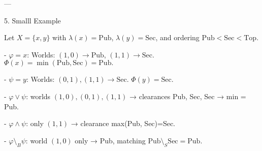 ---

 5. Smalll Example

Let \(X=\{x,y\}\) with \(\lambda(x)=\mathrm{Pub}\), \(\lambda(y)=\mathrm{Sec}\),
and ordering \(\mathrm{Pub}<\mathrm{Sec}<\mathrm{Top}\).

- \(\varphi = x\):  
  Worlds: \((1,0)\to\mathrm{Pub}\), \((1,1)\to\mathrm{Sec}\).  
  \(\Phi(x)=\min(\mathrm{Pub},\mathrm{Sec})=\mathrm{Pub}.\)

- \(\psi = y\):  
  Worlds: \((0,1),(1,1)\to\mathrm{Sec}\).  
  \(\Phi(y)=\mathrm{Sec}.\)

- \(\varphi\vee\psi\): worlds \((1,0),(0,1),(1,1)\) → clearances Pub, Sec, Sec → min = Pub.

- \(\varphi\wedge\psi\): only \((1,1)\) → clearance max(Pub, Sec)=Sec.

- \(\varphi\setminus_B\psi\): world \((1,0)\) only → Pub, matching \(\mathrm{Pub}\setminus_S\mathrm{Sec}=\mathrm{Pub}.\)

